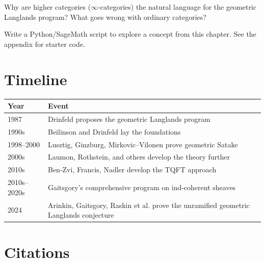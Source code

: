 \begin{exercise}
Why are higher categories ($\infty$-categories) the natural language for the geometric Langlands program? What goes wrong with ordinary categories?
\end{exercise}


\begin{exercise}[Computational]
Write a Python/SageMath script to explore a concept from this chapter. See the appendix for starter code.
\end{exercise}

\section{Timeline}

\begin{tabularx}{\linewidth}{lX}
\toprule
\textbf{Year} & \textbf{Event} \\ \midrule
1987 & Drinfeld proposes the geometric Langlands program \cite{drinfeld1987} \\ 
1990s & Beilinson and Drinfeld lay the foundations \cite{beilinson2004} \\ 
1998--2000 & Lusztig, Ginzburg, Mirkovic--Vilonen prove geometric Satake \cite{mirkovic2007} \\
2000s & Laumon, Rothstein, and others develop the theory further \\ 
2010s & Ben-Zvi, Francis, Nadler develop the TQFT approach \cite{benzvi2014} \\ 
2010s--2020s & Gaitsgory's comprehensive program on ind-coherent sheaves \cite{gaitsgory2009} \\ 
2024 & Arinkin, Gaitsgory, Raskin et al. prove the unramified geometric Langlands conjecture \cite{arinkin2024} \\ \bottomrule
\end{tabularx}

\section{Citations}

